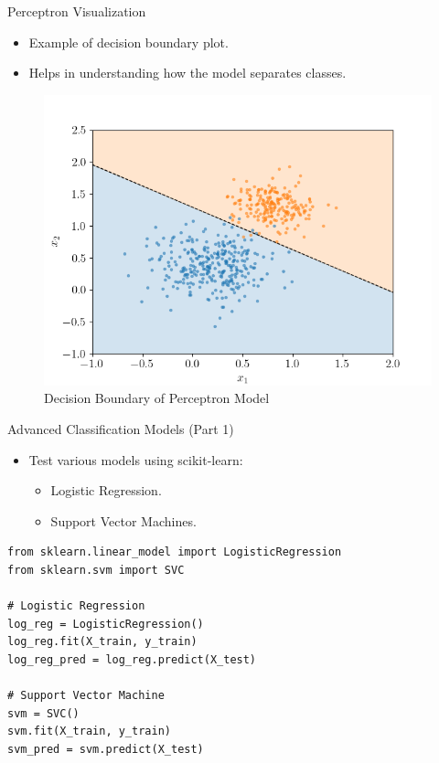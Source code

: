 \documentclass{beamer}
\begin{document}
\begin{frame}{Perceptron Visualization}
\begin{itemize}
    \item Example of decision boundary plot.
    \item Helps in understanding how the model separates classes.
\end{itemize}
\begin{figure}
    \centering
    \includegraphics[width=0.8\linewidth]{imgs/perceptron_decision_boundary.png}
    \caption{Decision Boundary of Perceptron Model}
\end{figure}
\end{frame}

\begin{frame}[fragile]{Advanced Classification Models (Part 1)}
\begin{itemize}
    \item Test various models using scikit-learn:
    \begin{itemize}
        \item Logistic Regression.
        \item Support Vector Machines.
    \end{itemize}
\end{itemize}
\begin{lstlisting}
from sklearn.linear_model import LogisticRegression
from sklearn.svm import SVC

# Logistic Regression
log_reg = LogisticRegression()
log_reg.fit(X_train, y_train)
log_reg_pred = log_reg.predict(X_test)

# Support Vector Machine
svm = SVC()
svm.fit(X_train, y_train)
svm_pred = svm.predict(X_test)
\end{lstlisting}
\end{frame}
\end{document}
